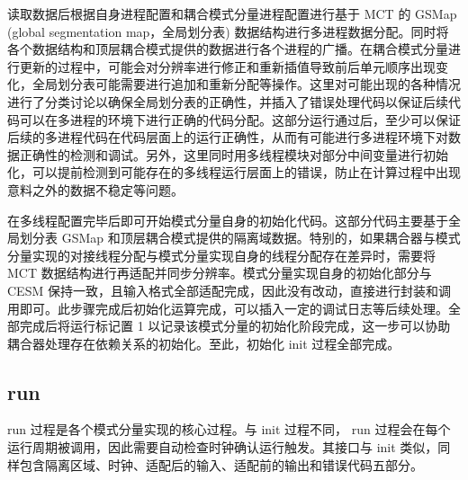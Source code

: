 读取数据后根据自身进程配置和耦合模式分量进程配置进行基于 MCT 的 GSMap (global segmentation map，全局划分表) 数据结构进行多进程数据分配。同时将各个数据结构和顶层耦合模式提供的数据进行各个进程的广播。在耦合模式分量进行更新的过程中，可能会对分辨率进行修正和重新插值导致前后单元顺序出现变化，全局划分表可能需要进行追加和重新分配等操作。这里对可能出现的各种情况进行了分类讨论以确保全局划分表的正确性，并插入了错误处理代码以保证后续代码可以在多进程的环境下进行正确的代码分配。这部分运行通过后，至少可以保证后续的多进程代码在代码层面上的运行正确性，从而有可能进行多进程环境下对数据正确性的检测和调试。另外，这里同时用多线程模块对部分中间变量进行初始化，可以提前检测到可能存在的多线程运行层面上的错误，防止在计算过程中出现意料之外的数据不稳定等问题。

在多线程配置完毕后即可开始模式分量自身的初始化代码。这部分代码主要基于全局划分表 GSMap 和顶层耦合模式提供的隔离域数据。特别的，如果耦合器与模式分量实现的对接线程分配与模式分量实现自身的线程分配存在差异时，需要将 MCT 数据结构进行再适配并同步分辨率。模式分量实现自身的初始化部分与 CESM 保持一致，且输入格式全部适配完成，因此没有改动，直接进行封装和调用即可。此步骤完成后初始化运算完成，可以插入一定的调试日志等后续处理。全部完成后将运行标记置 1 以记录该模式分量的初始化阶段完成，这一步可以协助耦合器处理存在依赖关系的初始化。至此，初始化 init 过程全部完成。

\subsection{run}

run 过程是各个模式分量实现的核心过程。与 init 过程不同， run 过程会在每个运行周期被调用，因此需要自动检查时钟确认运行触发。其接口与 init 类似，同样包含隔离区域、时钟、适配后的输入、适配前的输出和错误代码五部分。